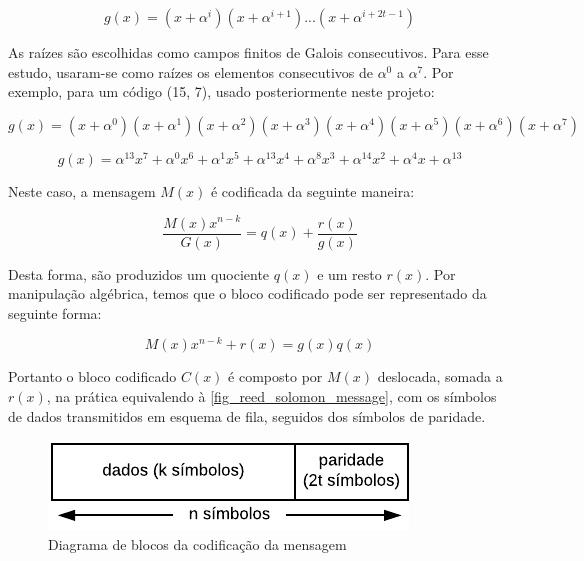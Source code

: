 	\begin{equation}
	g(x) = (x + \alpha^{i})(x + \alpha^{i+1})...(x + \alpha^{i + 2t - 1})  
	\end{equation}
	
	
	As raízes são escolhidas como campos finitos de Galois consecutivos. Para esse estudo, usaram-se como raízes os elementos consecutivos de $\alpha^{0}$ a $\alpha^{7}$. Por exemplo, para um código (15, 7), usado posteriormente neste projeto:
	 
	\begin{equation}
	g(x) = (x + \alpha^{0})(x + \alpha^{1})(x + \alpha^{2})(x + \alpha^{3})(x + \alpha^{4})(x + \alpha^{5})(x + \alpha^{6})(x + \alpha^{7})
	\end{equation}
	 
	\begin{equation}
	g(x) = \alpha^{13}x^{7} + \alpha^{0}x^{6} + \alpha^{1}x^{5} + \alpha^{13}x^{4} + \alpha^{8}x^{3} + \alpha^{14}x^{2} + \alpha^{4}x + \alpha^{13}
	\end{equation}
	
	
	Neste caso, a mensagem $M(x)$ é codificada da seguinte maneira:
	
	
	\begin{equation}
	\frac{M(x)x^{n-k}}{G(x)} = q(x) + \frac{r(x)}{g(x)}
	\end{equation}
	
	 
	Desta forma, são produzidos um quociente $q(x)$ e um resto $r(x)$. Por manipulação algébrica, temos que o bloco codificado pode ser representado da seguinte forma:
	 
	\begin{equation}
	M(x)x^{n-k} + r(x) = g(x)q(x)
	\end{equation}
	
	
	Portanto o bloco codificado $C(x)$ é composto por $M(x)$ deslocada, somada a $r(x)$, na prática equivalendo à \autoref{fig_reed_solomon_message}, com os símbolos de dados transmitidos em esquema de fila, seguidos dos símbolos de paridade.
	
	\begin{figure}[htb]
		\caption{\label{fig_reed_solomon_message} Diagrama de blocos da codificação da mensagem}
		\centering
		\includegraphics[width=0.4\textheight]{frame/rs-codeword.pdf}
	\end{figure}
	
